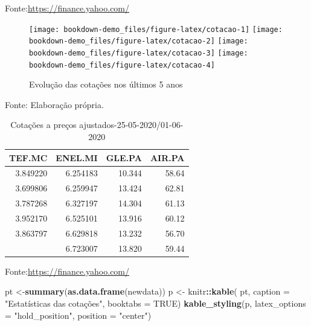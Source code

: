 \documentclass[
  12pt,
  a4paper,
  openany]{book}
\newenvironment{Shaded}{\begin{snugshade}}{\end{snugshade}}
\newcommand{\DataTypeTok}[1]{\textcolor[rgb]{0.13,0.29,0.53}{#1}}
\newcommand{\KeywordTok}[1]{\textcolor[rgb]{0.13,0.29,0.53}{\textbf{#1}}}
\newcommand{\NormalTok}[1]{#1}
\newcommand{\OperatorTok}[1]{\textcolor[rgb]{0.81,0.36,0.00}{\textbf{#1}}}
\newcommand{\OtherTok}[1]{\textcolor[rgb]{0.56,0.35,0.01}{#1}}
\newcommand{\StringTok}[1]{\textcolor[rgb]{0.31,0.60,0.02}{#1}}
\begin{document}
Fonte:\url{https://finance.yahoo.com/}

\justifying
\bigskip

\begin{figure}

{\centering \texttt{[image: bookdown-demo\_files/figure-latex/cotacao-1]} \texttt{[image: bookdown-demo\_files/figure-latex/cotacao-2]} \texttt{[image: bookdown-demo\_files/figure-latex/cotacao-3]} \texttt{[image: bookdown-demo\_files/figure-latex/cotacao-4]} 

}

\caption{Evolução das cotações nos últimos 5 anos}\label{fig:cotacao}
\end{figure}

\FloatBarrier
\centering

Fonte: Elaboração própria.

\justifying
\bigskip

\begin{table}[!h]

\caption{\label{tab:unnamed-chunk-5}Cotações a preços ajustados-25-05-2020/01-06-2020}
\centering
\begin{tabular}[t]{rrrr}
\toprule
TEF.MC & ENEL.MI & GLE.PA & AIR.PA\\
\midrule
3.849220 & 6.254183 & 10.344 & 58.64\\
3.699806 & 6.259947 & 13.424 & 62.81\\
3.787268 & 6.327197 & 14.304 & 61.13\\
3.952170 & 6.525101 & 13.916 & 60.12\\
3.863797 & 6.629818 & 13.232 & 56.70\\
\addlinespace
4.008655 & 6.723007 & 13.820 & 59.44\\
\bottomrule
\end{tabular}
\end{table}
\FloatBarrier
\centering

Fonte:\url{https://finance.yahoo.com/}

\justifying
\bigskip
\scriptsize

\begin{Shaded}
\begin{Highlighting}[]
\NormalTok{pt \textless{}{-}}\KeywordTok{summary}\NormalTok{(}\KeywordTok{as.data.frame}\NormalTok{(newdata))}
\NormalTok{p \textless{}{-}}\StringTok{ }\NormalTok{knitr}\OperatorTok{::}\KeywordTok{kable}\NormalTok{(}
\NormalTok{pt, }\DataTypeTok{caption =} \StringTok{"Estatísticas das cotações"}\NormalTok{,}
\DataTypeTok{booktabs =} \OtherTok{TRUE}\NormalTok{)}
\KeywordTok{kable\_styling}\NormalTok{(p, }\DataTypeTok{latex\_options =} \StringTok{"hold\_position"}\NormalTok{, }\DataTypeTok{position =} \StringTok{"center"}\NormalTok{)}
\end{Highlighting}
\end{Shaded}
\end{document}
